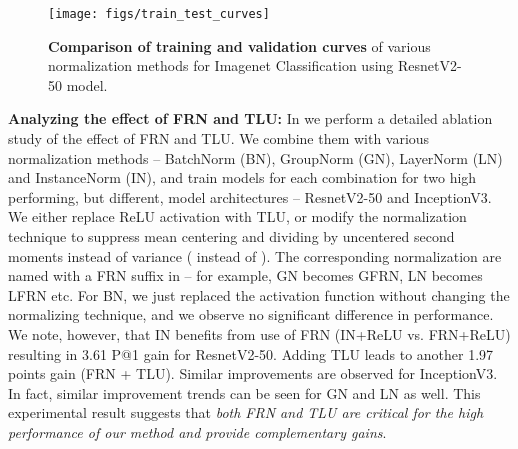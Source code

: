 \documentclass[10pt,twocolumn,letterpaper]{article}
\newcommand{\orelu}{TLU}
\newcommand{\relu}{ReLU}
\newcommand{\papername}{FRN}
\newcommand{\momentnorm}{FRN}
\begin{document}
\begin{figure}[t]
\begin{center}
   \texttt{[image: figs/train\_test\_curves]}
\end{center}
\vspace{-0.7cm}
   \caption{\textbf{Comparison of training and validation curves} of various normalization methods for Imagenet Classification using ResnetV2-50 model.}
\label{fig:train_test_curves}
\vspace{-0.4cm}
\end{figure}


\medskip
\noindent
\textbf{Analyzing the effect of \momentnorm{} and \orelu{}:}
In  we perform a detailed ablation study of the effect of \momentnorm{} and \orelu{}. We combine them with various normalization methods -- BatchNorm (BN), GroupNorm (GN), LayerNorm (LN) and InstanceNorm (IN), and train models for each combination for two high performing, but different, model architectures -- ResnetV2-50 and InceptionV3. 
We either replace \relu{} activation with \orelu{}, or modify the normalization technique to suppress mean centering and dividing by uncentered second moments instead of variance ( instead of ). The corresponding normalization are named with a \papername{} suffix in  -- for example, GN becomes GFRN, LN becomes LFRN etc. For BN, we just replaced the activation function without changing the normalizing technique, and we observe no significant difference in performance.
We note, however, that IN benefits from use of \momentnorm{} (IN+ReLU vs. \momentnorm{}+ReLU) resulting in 3.61 P@1 gain for ResnetV2-50. Adding \orelu{} leads to another 1.97 points gain (\momentnorm{} + \orelu{}). Similar improvements are observed for InceptionV3. 
In fact, similar improvement trends can be seen for GN and LN as well. This experimental result suggests that \emph{both \momentnorm{} and \orelu{} are critical for the high performance of our method and provide complementary gains}.
\end{document}
